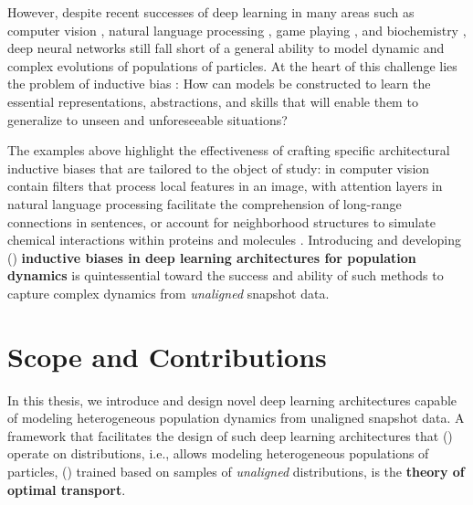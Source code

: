 However, despite recent successes of deep learning in many areas such as computer vision \citep{lecun1998gradient, krizhevsky2012imagenet}, natural language processing \citep{bengio2000neural, vaswani2017attention}, game playing \citep{mnih2015human, silver2016mastering}, and biochemistry \citep{jumper2021highly, kipf2016semi, jin2021iterative}, deep neural networks still fall short of a general ability to model dynamic and complex evolutions of populations of particles.
At the heart of this challenge lies the problem of inductive bias \citep{mitchell1980need}: How can models be constructed to learn the essential representations, abstractions, and skills that will enable them to generalize to unseen and unforeseeable situations?

The examples above highlight the effectiveness of crafting specific architectural inductive biases that are tailored to the object of study:  in computer vision contain filters that process local features in an image,  with attention layers in natural language processing facilitate the comprehension of long-range connections in sentences, or  account for neighborhood structures to simulate chemical interactions within proteins and molecules \citep{ganea2021geomol, somnath2021multi}.
Introducing and developing () \textbf{inductive biases in deep learning architectures for population dynamics}  is quintessential toward the success and ability of such methods to capture complex dynamics from \emph{unaligned} snapshot data.


\section{Scope and Contributions}

In this thesis, we introduce and design novel deep learning architectures capable of modeling heterogeneous population dynamics from unaligned snapshot data.
A framework that facilitates the design of such deep learning architectures that () operate on distributions, i.e., allows modeling heterogeneous populations of particles, () trained based on samples of \emph{unaligned} distributions, is the \textbf{theory of optimal transport}.


